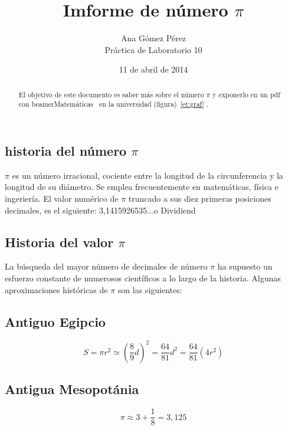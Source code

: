 \documentclass{beamer}
\begin{document}
\begin{frame}
\title[Presentación]{Imforme de número $\pi$}
\author{Ana Gómez Pérez\\ Práctica de Laboratorio 10}
\date{11 de abril de 2014}


\begin{abstract}
El objetivo de este documento es saber más sobre el número $\pi$ y exponerlo en un pdf con beamer\alert{Matemáticas}~\cite{guia} en la universidad (figura)~\ref{et:graf} .
\end{abstract}
\end{frame}

\begin{frame}
\section{historia del número $\pi$}
$\pi$ es un número irracional, cociente entre la longitud de la circunferencia y la longitud
de su diámetro. Se emplea frecuentemente en matemáticas, física e ingeriería. El valor numérico
de $\pi$ truncado a sus diez primeras posiciones decimales, es el siguiente: 3,1415926535...o
Dividiend
\end{frame}

\begin{frame}
\section{Historia del valor $\pi$}
La búsqueda del mayor número de decimales de número $\pi$ ha supuesto un esfuerzo constante de numerosos científicos a lo largo de la historia.
Algunas aproximaciones históricas de $\pi$ son las siguientes:
 \subsection{Antiguo Egipcio}
 \[S=\pi r^2 \simeq (\frac{8}{9}d)^2 = \frac{64}{81}d^2 = \frac{64}{81}(4r^2)\]
 \subsection{Antigua Mesopotánia}
 \[ \pi \approx 3+\frac{1}{8}=3,125\]


\end{frame}

\end{document}
